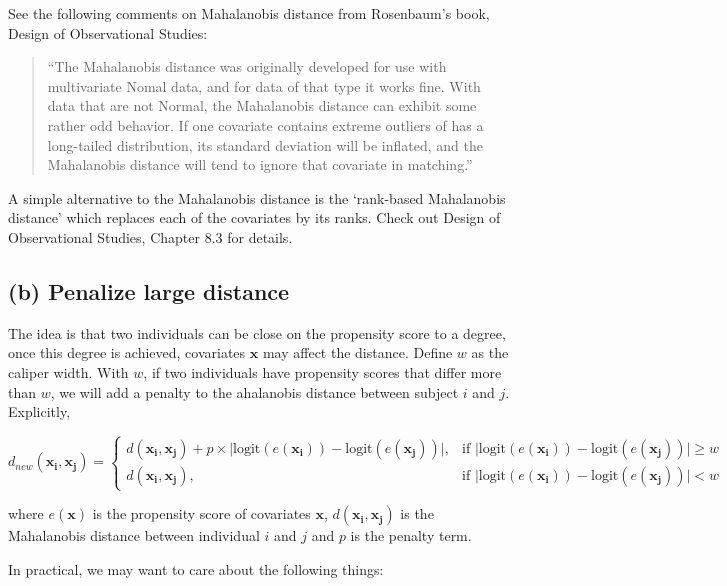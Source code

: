 \documentclass[
]{book}
\begin{document}
See the following comments on Mahalanobis distance from Rosenbaum's book, Design of Observational Studies:

\begin{quote}
``The Mahalanobis distance was originally developed for use with multivariate Nomal data, and for data of that type it works fine. With data that are not Normal, the Mahalanobis distance can exhibit some rather odd behavior. If one covariate contains extreme outliers of has a long-tailed distribution, its standard deviation will be inflated, and the Mahalanobis distance will tend to ignore that covariate in matching.''
\end{quote}

A simple alternative to the Mahalanobis distance is the `rank-based Mahalanobis distance' which replaces each of the covariates by its ranks. Check out Design of Observational Studies, Chapter 8.3 for details.

\hypertarget{b-penalize-large-distance}{%
\subsection{(b) Penalize large distance}\label{b-penalize-large-distance}}

The idea is that two individuals can be close on the propensity score to a degree, once this degree is achieved, covariates \(\mathbf{x}\) may affect the distance. Define \(w\) as the caliper width. With \(w\), if two individuals have propensity scores that differ more than \(w\), we will add a penalty to the ahalanobis distance between subject \(i\) and \(j\). Explicitly,

\[d_{new}(\mathbf{x_i}, \mathbf{x_j})= 
\begin{cases}
    d(\mathbf{x_i}, \mathbf{x_j}) + p\times \big|\text{logit}(e(\mathbf{x_i}))-\text{logit}(e(\mathbf{x_j}))\big|,& \text{if } \big|\text{logit}(e(\mathbf{x_i}))-\text{logit}(e(\mathbf{x_j}))\big| \geq w\\
    d(\mathbf{x_i}, \mathbf{x_j}),              & \text{if } \big|\text{logit}(e(\mathbf{x_i}))-\text{logit}(e(\mathbf{x_j}))\big| < w
\end{cases}\]

where \(e(\mathbf{x})\) is the propensity score of covariates \(\mathbf{x}\), \(d(\mathbf{x_i}, \mathbf{x_j})\) is the Mahalanobis distance between individual \(i\) and \(j\) and \(p\) is the penalty term.

In practical, we may want to care about the following things:
\end{document}
